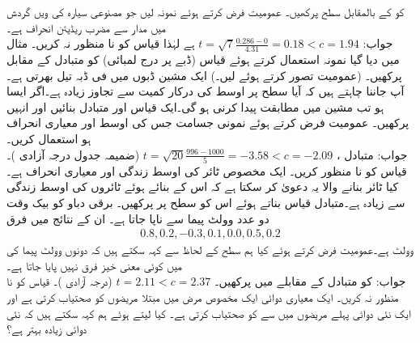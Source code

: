 \quad
{} کو  کے بالمقابل سطح  پرکھیں۔ عمومیت فرض کرتے ہوئے نمونہ  لیں جو مصنوعی سیارہ  کی  ویں گردش میں مدار سے مضرب  ریڈیئن انحراف ہے۔\\
جواب:\quad
$t=\sqrt{7}\tfrac{0.286-0}{4.31}=0.18<c=1.94$
ہے لہٰذا قیاس کو نا منظور نہ کریں۔
\quad
مثال  میں دیا گیا نمونہ استعمال کرتے ہوئے قیاس  (ڈبے پر درج لمبائی) کو متبادل  کے مقابل پرکھیں۔ (عمومیت تصور کرتے ہوئے  لیں۔)
\quad
ایک مشین ڈبوں میں فی ڈبہ  تیل بھرتی ہے۔آپ جاننا چاہتے ہیں کہ آیا  سطح پر اوسط کی درکار کمیت  سے  تجاوز زیادہ ہے۔اگر ایسا ہو تب مشین میں مطابقت پیدا کرنی ہو گی۔ایک قیاس اور متبادل  بنائیں اور انہیں پرکھیں۔ عمومیت فرض کرتے ہوئے نمونی جسامت  جس کی  اوسط  اور معیاری انحراف   ہو استعمال کریں۔\\
جواب:\quad
متبادل ،
$t=\sqrt{20}\tfrac{996-1000}{5}=-3.58<c=-2.09$
(ضمیمہ  جدول   درجہ آزادی )۔ قیاس  کو نا منظور کریں۔
\quad
ایک مخصوص ٹائر کی اوسط زندگی  اور معیاری انحراف  ہے۔کیا ٹائر بنانے والا یہ دعویٰ کر سکتا ہے کہ اس کے بنائے ہوئے ٹائروں کی اوسط زندگی  سے زیادہ ہے۔متبادل قیاس بناتے ہوئے اس کو  سطح پر پرکھیں۔
\quad
برقی دباو کو بیک وقت دو عدد وولٹ پیما سے ناپا جاتا ہے۔ ان کے نتائج میں فرق 
\begin{align*}
0.8,0.2,-0.3,0.1,0.0,0.5,0.2
\end{align*}
 وولٹ  ہے۔عمومیت فرض کرتے ہوئے کیا ہم  سطح کے لحاظ سے کہہ سکتے ہیں کہ دونوں وولٹ پیما کی  میں کوئی معنی خیز فرق نہیں پایا جاتا ہے۔\\
جواب:\quad
{} کو متبادل  کے مقابلے میں پرکھیں۔
$t=2.11<c=2.37$
(درجہ آزادی )۔ قیاس کو نا منظور نہ کریں۔
\quad
ایک معیاری دوائی ایک مخصوص مرض  میں مبتلا  مریضوں کو صحتیاب کرتی ہے اور ایک نئی دوائی پہلے  مریضوں میں سے  کو صحتیاب کرتی ہے۔  کیا  لیتے ہوئے ہم کہہ سکتے ہیں کہ نئی دوائی زیادہ بہتر ہے؟

